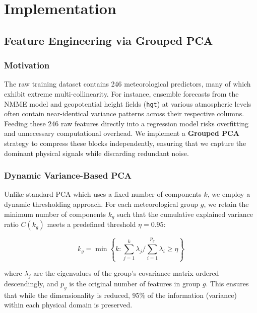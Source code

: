 \section{Implementation}

\subsection{Feature Engineering via Grouped PCA}

\subsubsection{Motivation}

The raw training dataset contains 246 meteorological predictors, many of which exhibit extreme multi-collinearity. For instance, ensemble forecasts from the NMME model and geopotential height fields (\texttt{hgt}) at various atmospheric levels often contain near-identical variance patterns across their respective columns. Feeding these 246 raw features directly into a regression model risks overfitting and unnecessary computational overhead. We implement a \textbf{Grouped PCA} strategy to compress these blocks independently, ensuring that we capture the dominant physical signals while discarding redundant noise.

\subsubsection{Dynamic Variance-Based PCA}

Unlike standard PCA which uses a fixed number of components $k$, we employ a dynamic thresholding approach. For each meteorological group $g$, we retain the minimum number of components $k_g$ such that the cumulative explained variance ratio $C(k_g)$ meets a predefined threshold $\eta = 0.95$:

\begin{equation}
    k_g = \min \left\{ k : \sum_{j=1}^{k} \lambda_j / \sum_{i=1}^{p_g} \lambda_i \ge \eta \right\}
    \label{eq:dynamic_pca}
\end{equation}

where $\lambda_j$ are the eigenvalues of the group's covariance matrix ordered descendingly, and $p_g$ is the original number of features in group $g$. This ensures that while the dimensionality is reduced, 95\% of the information (variance) within each physical domain is preserved.

